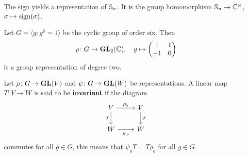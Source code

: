 \begin{example}
	The sign yields a representation of $\mathbb{S}_n$. It is the group homomorphism
	$\mathbb{S}_n\to\mathbb{C}^\times$, $\sigma\mapsto\operatorname{sign}(\sigma)$.  	
\end{example}

\begin{example}
	Let $G=\langle g:g^6=1\rangle$ be the cyclic group of order six. Then
	\[
	\rho\colon G\to\mathbf{GL}_2(\mathbb{C}),
	\quad 
	g\mapsto\begin{pmatrix}1&1\\-1&0\end{pmatrix}
	\] 
	is a group representation of degree two. 
\end{example}

%
%
%
%
\begin{definition}
    Let $\rho\colon G\to\mathbf{GL}(V)$ and $\psi\colon G\to\mathbf{GL}(W)$ be
    representations. A linear map $T\colon V\to W$ is said to be \textbf{invariant} 
    if the diagram
    \[\begin{tikzcd}
	V & V \\
	W & W
	\arrow["{\rho_g}", from=1-1, to=1-2]
	\arrow["T"', from=1-1, to=2-1]
	\arrow["{\psi_g}"', from=2-1, to=2-2]
	\arrow["T", from=1-2, to=2-2]
\end{tikzcd}\]
    commutes for all $g\in G$, this means that 
    $\psi_gT=T\rho_g$ for all $g\in G$.
\end{definition}


